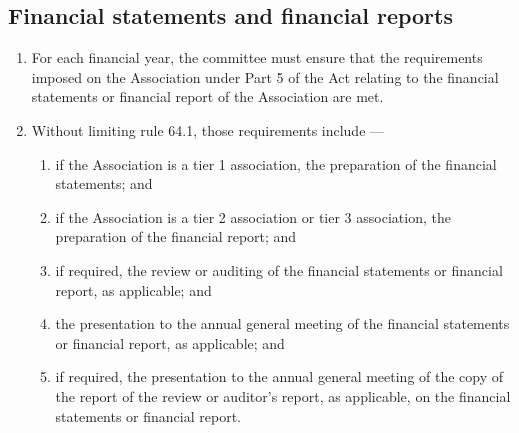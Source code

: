 \documentclass[../constitution.tex]{subfiles}
\begin{document}
\hypertarget{financial-statements-and-financial-reports}{%
\subsection{Financial statements and financial reports}\label{financial-statements-and-financial-reports}}

\begin{enumerate}

\item For each financial year, the committee must ensure that the requirements imposed on the Association under Part 5 of the Act relating to the financial statements or financial report of the Association are met.
\item Without limiting rule 64.1, those requirements include ---

  \begin{enumerate}
  
  \item if the Association is a tier 1 association, the preparation of the financial statements; and
  \item if the Association is a tier 2 association or tier 3 association, the preparation of the financial report; and
  \item if required, the review or auditing of the financial statements or financial report, as applicable; and
  \item the presentation to the annual general meeting of the financial statements or financial report, as applicable; and
  \item if required, the presentation to the annual general meeting of the copy of the report of the review or auditor's report, as applicable, on the financial statements or financial report.
  \end{enumerate}
\end{enumerate}
\end{document}
